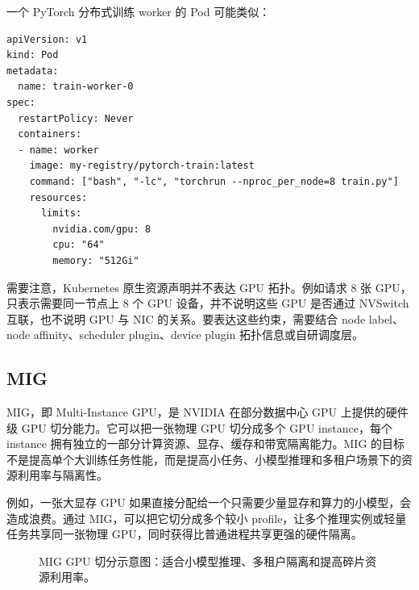 一个 PyTorch 分布式训练 worker 的 Pod 可能类似：

\begin{lstlisting}[caption={分布式训练 Worker Pod 的资源声明示例},label={lst:pytorch-worker-gpu-request}]
apiVersion: v1
kind: Pod
metadata:
  name: train-worker-0
spec:
  restartPolicy: Never
  containers:
  - name: worker
    image: my-registry/pytorch-train:latest
    command: ["bash", "-lc", "torchrun --nproc_per_node=8 train.py"]
    resources:
      limits:
        nvidia.com/gpu: 8
        cpu: "64"
        memory: "512Gi"
\end{lstlisting}

需要注意，Kubernetes 原生资源声明并不表达 GPU 拓扑。例如请求 8 张 GPU，只表示需要同一节点上 8 个 GPU 设备，并不说明这些 GPU 是否通过 NVSwitch 互联，也不说明 GPU 与 NIC 的关系。要表达这些约束，需要结合 node label、node affinity、scheduler plugin、device plugin 拓扑信息或自研调度层。

\subsection{MIG}
\label{subsec:mig}

MIG，即 Multi-Instance GPU，是 NVIDIA 在部分数据中心 GPU 上提供的硬件级 GPU 切分能力。它可以把一张物理 GPU 切分成多个 GPU instance，每个 instance 拥有独立的一部分计算资源、显存、缓存和带宽隔离能力。MIG 的目标不是提高单个大训练任务性能，而是提高小任务、小模型推理和多租户场景下的资源利用率与隔离性。

例如，一张大显存 GPU 如果直接分配给一个只需要少量显存和算力的小模型，会造成浪费。通过 MIG，可以把它切分成多个较小 profile，让多个推理实例或轻量任务共享同一张物理 GPU，同时获得比普通进程共享更强的硬件隔离。

\begin{figure}[H]
  \centering
  \caption{MIG GPU 切分示意图：适合小模型推理、多租户隔离和提高碎片资源利用率。}
  \label{fig:mig-gpu-partition}
\end{figure}

